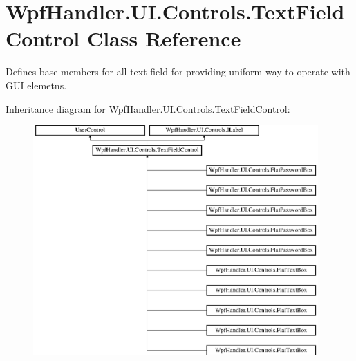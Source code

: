 \hypertarget{class_wpf_handler_1_1_u_i_1_1_controls_1_1_text_field_control}{}\section{Wpf\+Handler.\+U\+I.\+Controls.\+Text\+Field\+Control Class Reference}
\label{class_wpf_handler_1_1_u_i_1_1_controls_1_1_text_field_control}


Defines base members for all text field for providing uniform way to operate with G\+UI elemetns.  


Inheritance diagram for Wpf\+Handler.\+U\+I.\+Controls.\+Text\+Field\+Control\+:\begin{figure}[H]
\begin{center}
\leavevmode
\includegraphics[height=8.818898cm]{d2/dda/class_wpf_handler_1_1_u_i_1_1_controls_1_1_text_field_control}
\end{center}
\end{figure}
